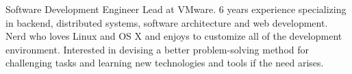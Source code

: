 

\begin{cvparagraph}

Software Development Engineer Lead at VMware. 6 years experience specializing in backend, distributed systems, software architecture and web development. Nerd who loves Linux and OS X and enjoys to customize all of the development environment. Interested in devising a better problem-solving method for challenging tasks and learning new technologies and tools if the need arises.
\end{cvparagraph}
